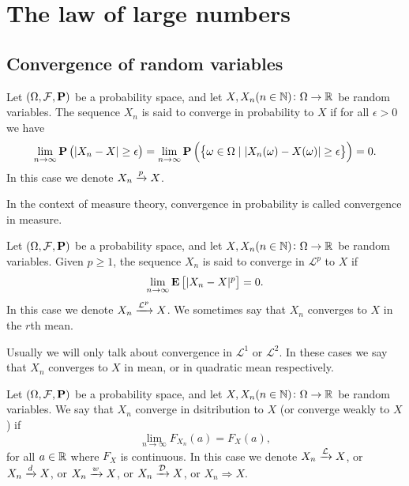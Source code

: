 \documentclass[11pt,a4paper]{article}
\begin{document}
\newpage

\section{The law of large numbers}
\subsection{Convergence of random variables}
\label{sec:convergence-of-rv}

\begin{definition}
  Let $(\Omega, \mathcal F, \mathbf{P})$ be a probability space, and let
  $X,X_n(n \in \mathbb{N}) \colon \Omega \to \mathbb{R}$ be random variables.
  The sequence $X_n$ is said to converge in probability to $X$ if
  for all $\epsilon > 0$ we have
  \[
    \lim_{n \to \infty}
    \mathbf{P}\left(|X_n - X| \geq \epsilon\right) =
    \lim_{n \to \infty}
    \mathbf{P}\left(\left\{\omega \in \Omega \mid
      |X_n(\omega) - X(\omega)| \geq \epsilon\right\}\right) = 0.
  \]
  In this case we denote $X_n \xrightarrow{p} X$.
\end{definition}

\begin{remark}
  In the context of measure theory,
  convergence in probability is called convergence in measure.
\end{remark}

\begin{definition}
  Let $(\Omega, \mathcal F, \mathbf{P})$ be a probability space, and let
  $X,X_n(n \in \mathbb{N}) \colon \Omega \to \mathbb{R}$ be random variables.
  Given $p \geq 1$, the sequence $X_n$ is said to converge in $\mathcal L^p$
  to $X$ if
  \[
    \lim_{n \to \infty} \mathbf{E}\left[|X_n - X|^p\right] = 0.
  \]
  In this case we denote $X_n \xrightarrow{\mathcal L^p} X$.
  We sometimes say that $X_n$ converges to $X$ in the $r$th mean.
\end{definition}

\begin{remark}
  Usually we will only talk about convergence in $\mathcal L^1$
  or $\mathcal L^2$.
  In these cases we say that $X_n$ converges to $X$
  in mean, or in quadratic mean respectively.
\end{remark}

\begin{definition}
  Let $(\Omega, \mathcal F, \mathbf{P})$ be a probability space, and let
  $X,X_n(n \in \mathbb{N}) \colon \Omega \to \mathbb{R}$ be random variables.
  We say that $X_n$ converge in dsitribution to $X$
  (or converge weakly to $X$) if
  \[
    \lim_{n \to \infty} F_{X_n}(a) = F_X(a),
  \]
  for all $a \in \mathbb{R}$ where $F_X$ is continuous.
  In this case we denote
  $X_n \xrightarrow{\mathcal L} X$,
  or $X_n \xrightarrow{d} X$,
  or $X_n \xrightarrow{w} X$,
  or $X_n \xrightarrow{\mathcal D} X$,
  or $X_n \Rightarrow X$.
\end{definition}
\end{document}
